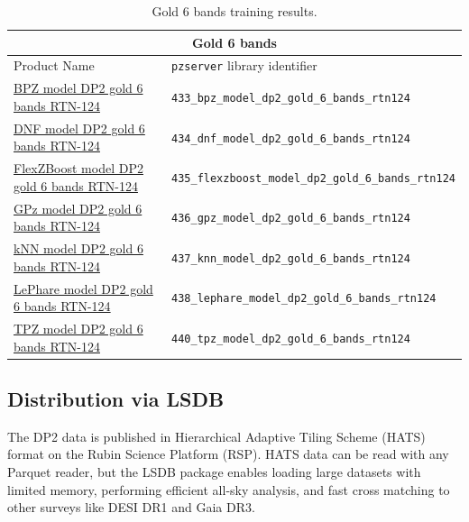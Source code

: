 \begin{table}
\centering
\begin{tabular}{ll}
\hline
\multicolumn{2}{c}{Gold 6 bands} \\ \hline
Product Name & \texttt{pzserver} library identifier \\
\hline
\hline
\href{https://pzserver.linea.org.br/product/433_bpz_model_dp2_gold_6_bands_rtn124}
{BPZ model DP2 gold 6 bands RTN-124}
&
\texttt{433\_bpz\_model\_dp2\_gold\_6\_bands\_rtn124}
\\
\href{https://pzserver.linea.org.br/product/434_dnf_model_dp2_gold_6_bands_rtn124}
{DNF model DP2 gold 6 bands RTN-124}
&
\texttt{434\_dnf\_model\_dp2\_gold\_6\_bands\_rtn124}
\\
\href{https://pzserver.linea.org.br/product/435_flexzboost_model_dp2_gold_6_bands_rtn124}
{FlexZBoost model DP2 gold 6 bands RTN-124}
&
\texttt{435\_flexzboost\_model\_dp2\_gold\_6\_bands\_rtn124}
\\
\href{https://pzserver.linea.org.br/product/436_gpz_model_dp2_gold_6_bands_rtn124}
{GPz model DP2 gold 6 bands RTN-124}
&
\texttt{436\_gpz\_model\_dp2\_gold\_6\_bands\_rtn124}
\\
\href{https://pzserver.linea.org.br/product/437_knn_model_dp2_gold_6_bands_rtn124}
{kNN model DP2 gold 6 bands RTN-124}
&
\texttt{437\_knn\_model\_dp2\_gold\_6\_bands\_rtn124}
\\
\href{https://pzserver.linea.org.br/product/438_lephare_model_dp2_gold_6_bands_rtn124}
{LePhare model DP2 gold 6 bands RTN-124}
&
\texttt{438\_lephare\_model\_dp2\_gold\_6\_bands\_rtn124}
\\
\href{https://pzserver.linea.org.br/product/440_tpz_model_dp2_gold_6_bands_rtn124}
{TPZ model DP2 gold 6 bands RTN-124}
&
\texttt{440\_tpz\_model\_dp2\_gold\_6\_bands\_rtn124}
\\
\hline
\end{tabular}
\caption{Gold 6 bands training results.}
\label{tab:pzserver-gold-6-bands}
\end{table}




\subsection{Distribution via LSDB}
\label{sec:distribution:lsdb}

The DP2 data is published in Hierarchical Adaptive Tiling Scheme (HATS) format on the Rubin Science Platform (RSP). HATS data can be read with any Parquet reader, but
the LSDB package \citep{2025arXiv250102103C} enables loading large datasets with limited memory, performing efficient all-sky analysis, and fast cross matching to other surveys like DESI DR1 and Gaia DR3.

